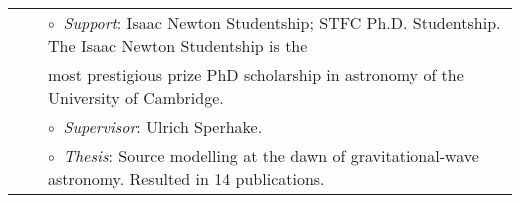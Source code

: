 \documentclass[11pt,letterpaper,sans]{moderncv}
\begin{document}
\vspace{-0.1cm}
\begin{tabular}{rcl}
&\hspace{0.4cm} &$\circ\;\;${\textit{Support}}: Isaac Newton Studentship; STFC Ph.D. Studentship. The 
Isaac Newton Studentship is the \\&\hspace{0.4cm} &  \hspace{0.4cm}
most prestigious prize PhD scholarship in astronomy of the University of Cambridge.\\
&\hspace{0.4cm} &$\circ\;\;${\textit{Supervisor}}: Ulrich Sperhake.\\
&\hspace{0.4cm} &$\circ\;\;${\textit{Thesis}}: Source modelling at the dawn of gravitational-wave astronomy. Resulted in 14 publications.\\
\end{tabular}


\end{document}
